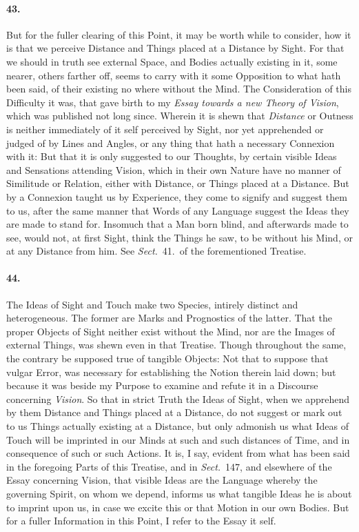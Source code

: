 \documentclass[]{article}
\newenvironment{sectionbody}{}{}
\begin{document}
\begin{sectionbody}
\paragraph{43.} But for the fuller clearing of this Point, it may be worth while
to consider, how it is that we perceive Distance and Things
placed at a Distance by Sight.  For that we should in truth see
external Space, and Bodies actually existing in it, some nearer,
others farther off, seems to carry with it some Opposition to
what hath been said, of their existing no where without the Mind.
The Consideration of this Difficulty it was, that gave birth to
my \emph{Essay towards a new Theory of Vision}, which was
published not long since.  Wherein it is shewn that
\emph{Distance} or Outness is neither immediately of it self
perceived by Sight, nor yet apprehended or judged of by Lines and
Angles, or any thing that hath a necessary Connexion with it: But
that it is only suggested to our Thoughts, by certain visible
Ideas and Sensations attending Vision, which in their own Nature
have no manner of Similitude or Relation, either with Distance,
or Things placed at a Distance.  But by a Connexion taught us by
Experience, they come to signify and suggest them to us, after
the same manner that Words of any Language suggest the Ideas they
are made to stand for.  Insomuch that a Man born blind, and
afterwards made to see, would not, at first Sight, think the
Things he saw, to be without his Mind, or at any Distance from
him.  See \emph{Sect.}~41.\ of the forementioned Treatise.



\paragraph{44.} The Ideas of Sight and Touch make two Species, intirely distinct
and heterogeneous.  The former are Marks and Prognostics of the
latter.  That the proper Objects of Sight neither exist without
the Mind, nor are the Images of external Things, was shewn even
in that Treatise.  Though throughout the same, the contrary be
supposed true of tangible Objects: Not that to suppose that
vulgar Error, was necessary for establishing the Notion therein
laid down; but because it was beside my Purpose to examine and
refute it in a Discourse concerning \emph{Vision}.  So that in
strict Truth the Ideas of Sight, when we apprehend by them
Distance and Things placed at a Distance, do not suggest or mark
out to us Things actually existing at a Distance, but only
admonish us what Ideas of Touch will be imprinted in our Minds at
such and such distances of Time, and in consequence of such or
such Actions.  It is, I say, evident from what has been said in
the foregoing Parts of this Treatise, and in \emph{Sect.}~147,
and elsewhere of the Essay concerning Vision, that visible Ideas
are the Language whereby the governing Spirit, on whom we depend,
informs us what tangible Ideas he is about to imprint upon us, in
case we excite this or that Motion in our own Bodies.  But for a
fuller Information in this Point, I refer to the Essay it self.




\end{sectionbody}
\end{document}
